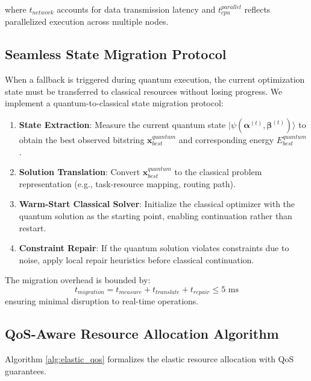 \documentclass[lettersize,journal]{IEEEtran}
\begin{document}
where $t_{network}$ accounts for data transmission latency and $t_{cpu}^{parallel}$ reflects parallelized execution across multiple nodes.

\subsection{Seamless State Migration Protocol}
\label{subsec:state_migration}
When a fallback is triggered during quantum execution, the current optimization state must be transferred to classical resources without losing progress. We implement a quantum-to-classical state migration protocol:

\begin{enumerate}
    \item \textbf{State Extraction}: Measure the current quantum state $|\psi(\boldsymbol{\alpha}^{(t)}, \boldsymbol{\beta}^{(t)})\rangle$ to obtain the best observed bitstring $\mathbf{x}_{best}^{quantum}$ and corresponding energy $E_{best}^{quantum}$.
    
    \item \textbf{Solution Translation}: Convert $\mathbf{x}_{best}^{quantum}$ to the classical problem representation (e.g., task-resource mapping, routing path).
    
    \item \textbf{Warm-Start Classical Solver}: Initialize the classical optimizer with the quantum solution as the starting point, enabling continuation rather than restart.
    
    \item \textbf{Constraint Repair}: If the quantum solution violates constraints due to noise, apply local repair heuristics before classical continuation.
\end{enumerate}

The migration overhead is bounded by:
\begin{equation}
t_{migration} = t_{measure} + t_{translate} + t_{repair} \leq 5\text{ ms}
\label{eq:migration_overhead}
\end{equation}
ensuring minimal disruption to real-time operations.

\subsection{QoS-Aware Resource Allocation Algorithm}
\label{subsec:qos_algorithm}

Algorithm \ref{alg:elastic_qos} formalizes the elastic resource allocation with QoS guarantees.
\end{document}
